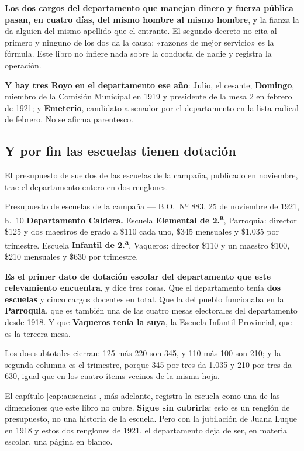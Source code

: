 \begin{cautela}
\textbf{Los dos cargos del departamento que manejan dinero y fuerza pública pasan, en cuatro
días, del mismo hombre al mismo hombre}, y la fianza la da alguien del mismo apellido que el
entrante. El segundo decreto no cita al primero y ninguno de los dos da la causa: «razones de
mejor servicio» es la fórmula. Este libro no infiere nada sobre la conducta de nadie y registra
la operación.

\textbf{Y hay tres Royo en el departamento ese año}: Julio, el cesante; \textbf{Domingo}, miembro
de la Comisión Municipal en 1919 y presidente de la mesa 2 en febrero de 1921; y
\textbf{Emeterio}, candidato a senador por el departamento en la lista radical de febrero. No se
afirma parentesco.
\end{cautela}

\subsection*{Y por fin las escuelas tienen dotación}

El presupuesto de sueldos de las escuelas de la campaña, publicado en noviembre, trae el
departamento entero en dos renglones.

\begin{ficha}{Presupuesto de escuelas de la campaña --- B.O.\ Nº 883, 25 de noviembre de 1921, h.\ 10}
\textbf{Departamento Caldera.} Escuela \textbf{Elemental de 2.\textsuperscript{a}}, Parroquia:
director \$125 y dos maestros de grado a \$110 cada uno, \$345 mensuales y \$1.035 por trimestre.
Escuela \textbf{Infantil de 2.\textsuperscript{a}}, Vaqueros: director \$110 y un maestro \$100,
\$210 mensuales y \$630 por trimestre.
\end{ficha}

\begin{cautela}
\textbf{Es el primer dato de dotación escolar del departamento que este relevamiento encuentra}, y
dice tres cosas. Que el departamento tenía \textbf{dos escuelas} y cinco cargos docentes en total.
Que la del pueblo funcionaba en la \textbf{Parroquia}, que es también una de las cuatro mesas
electorales del departamento desde 1918. Y que \textbf{Vaqueros tenía la suya}, la Escuela
Infantil Provincial, que es la tercera mesa.

Los dos subtotales cierran: 125 más 220 son 345, y 110 más 100 son 210; y la segunda columna es
el trimestre, porque 345 por tres da 1.035 y 210 por tres da 630, igual que en los cuatro ítems
vecinos de la misma hoja.

El capítulo \ref{cap:ausencias}, más adelante, registra la escuela como una de las dimensiones que este libro no
cubre. \textbf{Sigue sin cubrirla}: esto es un renglón de presupuesto, no una historia de la
escuela. Pero con la jubilación de Juana Luque en 1918 y estos dos renglones de 1921, el
departamento deja de ser, en materia escolar, una página en blanco.
\end{cautela}

